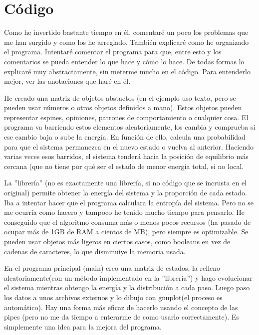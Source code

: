 \documentclass[a4paper,10pt,twocolumn]{article}
\begin{document}
\section*{C\'odigo}

Como he invertido bastante tiempo en \'el, comentar\'e un poco los problemas que me han surgido y como los he arreglado. Tambi\'en explicar\'e como he organizado el programa. Intentar\'e comentar el programa para que, entre esto y los comentarios se pueda entender lo que hace y c\'omo lo hace. De todas formas lo explicar\'e muy abstractamente, sin meterme mucho en el c\'odigo. Para entenderlo mejor, ver las anotaciones que har\'e en \'el.

He creado una matriz de objetos abstactos (en el ejemplo uso texto, pero se pueden usar n\'umeros o otros objetos definidos a mano). Estos objetos pueden representar espines, opiniones, patrones de comportamiento o cualquier cosa. El programa va barriendo estos elementos aleatoriamente, los cambia y comprueba si ese cambio baja o sube la energ\'ia. En funci\'on de ello, calcula una probabilidad para que el sistema permanezca en el nuevo estado o vuelva al anterior. Haciendo varias veces esos barridos, el sistema tender\'a hacia la posici\'on de equilibrio m\'as cercana (que no tiene por qu\'e ser el estado de menor energ\'ia total, si no local.

La ''librer\'ia'' (no es exactamente una librer\'ia, si no c\'odigo que se incrusta en el original) permite obtener la energ\'ia del sistema y la proporci\'on de cada estado. Iba a intentar hacer que el programa calculara la entrop\'ia del sistema. Pero no se me ocurr\'ia como hacero y tampoco he tenido mucho tiempo para pensarlo. He conseguido que el algoritmo consuma m\'as o menos pocos recursos (ha pasado de ocupar m\'as de 1GB de RAM a cientos de MB), pero siempre es optimizable. Se pueden usar objetos m\'as ligeros en ciertos casos, como booleans en vez de cadenas de caracteres, lo que disminuiye la memoria usada.

En el programa principal (main) creo una matriz de estados, la relleno aleatoriamente(con un m\'etodo implementado en la ''librer\'ia'') y hago evolucionar el sistema mientras obtengo la energ\'ia y la distribuci\'on a cada paso. Luego paso los datos a unos archivos externos y lo dibujo con gnuplot(el proceso es autom\'atico). Hay una forma m\'as eficaz de hacerlo usando el concepto de las pipes (pero no me da tiempo a enterarme de como usarlo correctamente). Es simplemente una idea para la mejora del programa.
\end{document}
